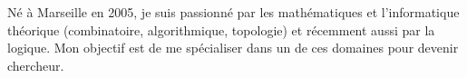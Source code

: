

\begin{cvparagraph}

    Né à Marseille en 2005, je suis passionné par les mathématiques et l'informatique théorique (combinatoire, algorithmique, topologie) et récemment aussi par la logique. Mon objectif est de me spécialiser dans un de ces domaines pour devenir chercheur.
\end{cvparagraph}